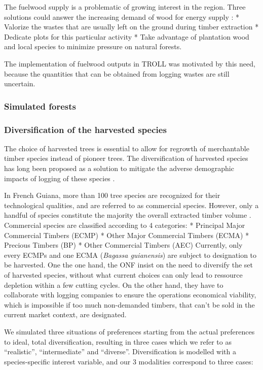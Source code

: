 \documentclass[12pt,]{article}
\theoremstyle{definition}
\theoremstyle{definition}
\theoremstyle{definition}
\theoremstyle{remark}
\begin{document}
The fuelwood supply is a problematic of growing interest in the region.
Three solutions could answer the increasing demand of wood for energy
supply : * Valorize the wastes that are usually left on the ground
during timber extraction * Dedicate plots for this particular activity *
Take advantage of plantation wood and local species to minimize pressure
on natural forests.

The implementation of fuelwood outputs in TROLL was motivated by this
need, because the quantities that can be obtained from logging wastes
are still uncertain.

\subsubsection{Simulated forests}\label{simulated-forests}

\subsubsection{Diversification of the harvested
species}\label{diversification-of-the-harvested-species}

The choice of harvested trees is essential to allow for regrowth of
merchantable timber species instead of pioneer trees. The
diversification of harvested species has long been proposed as a
solution to mitigate the adverse demographic impacts of logging of these
species \citep{Guitet2011}.

In French Guiana, more than 100 tree species are recognized for their
technological qualities, and are referred to as commercial species.
However, only a handful of species constitute the majority the overall
extracted timber volume \citep[every information on timber species is
in][]{Guitet2011}. Commercial species are classified according to 4
categories: * Principal Major Commercial Timbers (ECMP) * Other Major
Commercial Timbers (ECMA) * Precious Timbers (BP) * Other Commercial
Timbers (AEC) Currently, only every ECMPs and one ECMA (\emph{Bagassa
guianensis}) are subject to designation to be harvested. One the one
hand, the ONF insist on the need to diversify the set of harvested
species, without what current choices can only lead to ressource
depletion within a few cutting cycles. On the other hand, they have to
collaborate with logging companies to ensure the operations economical
viability, which is impossible if too much non-demanded timbers, that
can't be sold in the current market context, are designated.

We simulated three situations of preferences starting from the actual
preferences to ideal, total diversification, resulting in three cases
which we refer to as ``realistic'', ``intermediate'' and ``diverse''.
Diversification is modelled with a species-specific interest variable,
and our 3 modalities correspond to three cases:
\end{document}
